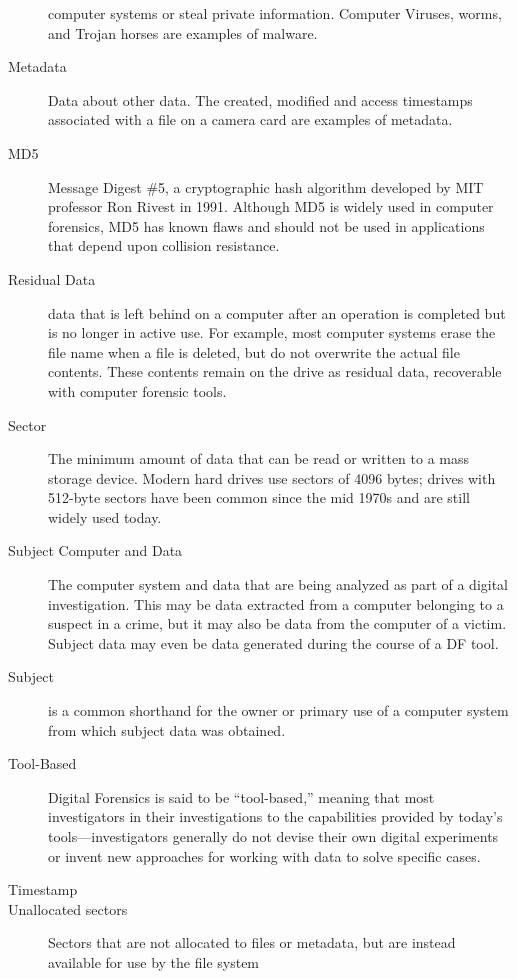 \begin{description}
  computer systems or steal private information. Computer Viruses,
  worms, and Trojan horses are examples of malware. 
\item[Metadata] Data about other data. The created, modified and
  access timestamps associated with a file on a camera card are
  examples of metadata.
\item[MD5] Message Digest \#5, a cryptographic hash algorithm
  developed by MIT professor Ron Rivest in 1991. Although MD5 is
  widely used in computer forensics, MD5 has known flaws and should
  not be used in applications that depend upon collision resistance.
\item[Residual Data] data that is left behind on a computer after an
  operation is completed but is no longer in active use. For example,
  most computer systems erase the file name when a file is deleted,
  but do not overwrite the actual file contents. These contents remain
  on the drive as residual data, recoverable with computer forensic tools.
\item[Sector] The minimum amount of data that can be read or written
  to a mass storage device. Modern hard drives use sectors of 4096
  bytes; drives with 512-byte sectors have been common since the mid
  1970s and are still widely used today.
\item[Subject Computer and Data] The computer system and data that are
  being analyzed as part of a digital investigation. This may be data
  extracted from a computer belonging to a suspect in a crime, but it
  may also be data from the computer of a victim. Subject data may
  even be data generated during the course of a DF tool.
\item[Subject] is a common shorthand for the owner or primary use of a computer
  system from which subject data was obtained. 
\item[Tool-Based] Digital Forensics is said to be ``tool-based,''
  meaning that most investigators in their investigations to the
  capabilities provided by today's tools---investigators generally do
  not devise their own digital experiments or invent new approaches
  for working with data to solve specific cases.
\item[Timestamp]
\item[Unallocated sectors] Sectors that are not allocated to files or
  metadata, but are instead available for use by the file system
\end{description}
